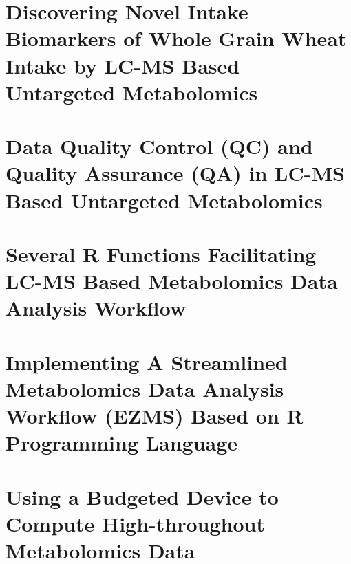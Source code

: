 \documentclass[]{report}
\begin{document}
\chapter{Discovering Novel Intake Biomarkers of Whole Grain Wheat Intake by LC-MS Based Untargeted Metabolomics}


\chapter{Data Quality Control (QC) and Quality Assurance (QA) in LC-MS Based Untargeted Metabolomics}


\chapter{Several R Functions Facilitating LC-MS Based Metabolomics Data Analysis Workflow}


\chapter{Implementing A Streamlined Metabolomics Data Analysis Workflow (EZMS) Based on R Programming Language}

\chapter{Using a Budgeted Device to Compute High-throughout Metabolomics Data}


\end{document}
